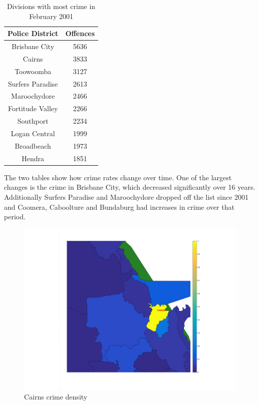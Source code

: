 \documentclass[]{article}
\begin{document}
\begin{table}[H]
    \caption{Divisions with most crime in February 2001}
    \centering
    \begin{tabular}{|c|c|}
        \hline
        Police District & Offences \\
        \hline
        Brisbane City & 5636 \\
        Cairns & 3833 \\
        Toowoomba & 3127 \\
        Surfers Paradise & 2613 \\
        Maroochydore & 2466 \\
        Fortitude Valley & 2266 \\
        Southport & 2234 \\
        Logan Central & 1999 \\
        Broadbeach & 1973 \\
        Hendra & 1851 \\
        \hline
    \end{tabular}
\end{table}

The two tables show how crime rates change over time.
One of the largest changes is the crime in Brisbane City, which decreased significantly over 16 years.
Additionally Surfers Paradise and Maroochydore dropped off the list since 2001 and Coomera, Caboolture and Bundaburg had increases in crime over that period.

\begin{figure}[H]
    \caption{Cairns crime density}
    \centering
    \label{fig:cairns_crime}
    \includegraphics[width=\linewidth]{../images/cairns_crime}
\end{figure}
\end{document}
